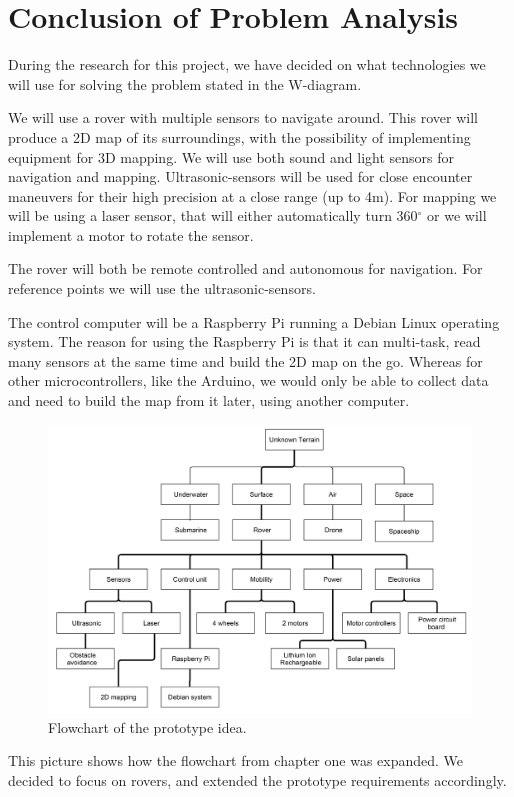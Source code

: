 \section{Conclusion of Problem Analysis}

During the research for this project, we have decided on what technologies we will use for solving the problem stated in the W-diagram.

We will use a rover with multiple sensors to navigate around. This rover will produce a 2D map of its surroundings, with the possibility of implementing equipment for 3D mapping. We will use both sound and light sensors for navigation and mapping. Ultrasonic-sensors will be used for close encounter maneuvers for their high precision at a close range (up to 4m)\cite{ultra}. For mapping we will be using a laser sensor, that will either automatically turn 360$^{\circ}$  or we will implement a motor to rotate the sensor.

The rover will both be remote controlled and autonomous for navigation. For reference points we will use the ultrasonic-sensors. %

The control computer will be a Raspberry Pi running a Debian Linux operating system. The reason for using the Raspberry Pi is that it can multi-task, read many sensors at the same time and build the 2D map on the go. Whereas for other microcontrollers, like the Arduino, we would only be able to collect data and need to build the map from it later, using another computer.

\begin{figure}[H]
	\centering
	\includegraphics[scale=.1]{images/level3.png}
	\caption{Flowchart of the prototype idea.}
	\label{fig:level3}
\end{figure}

This picture shows how the flowchart from chapter one was expanded. We decided to focus on rovers, and extended the prototype requirements accordingly.

\clearpage
